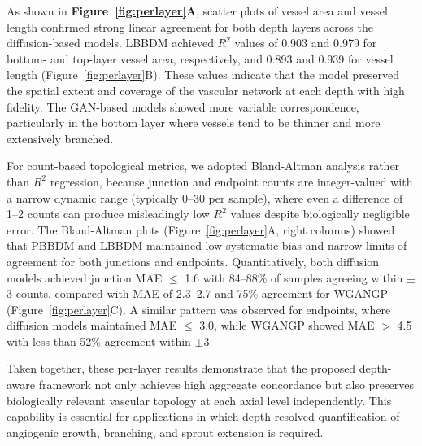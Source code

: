 As shown in \textbf{Figure~\ref{fig:perlayer}A}, scatter plots of vessel area and vessel length confirmed strong linear agreement for both depth layers across the diffusion-based models. LBBDM achieved $R^2$ values of 0.903 and 0.979 for bottom- and top-layer vessel area, respectively, and 0.893 and 0.939 for vessel length (Figure~\ref{fig:perlayer}B). These values indicate that the model preserved the spatial extent and coverage of the vascular network at each depth with high fidelity. The GAN-based models showed more variable correspondence, particularly in the bottom layer where vessels tend to be thinner and more extensively branched.

For count-based topological metrics, we adopted Bland-Altman analysis rather than $R^2$ regression, because junction and endpoint counts are integer-valued with a narrow dynamic range (typically 0--30 per sample), where even a difference of 1--2 counts can produce misleadingly low $R^2$ values despite biologically negligible error. The Bland-Altman plots (Figure~\ref{fig:perlayer}A, right columns) showed that PBBDM and LBBDM maintained low systematic bias and narrow limits of agreement for both junctions and endpoints. Quantitatively, both diffusion models achieved junction MAE $\leq$ 1.6 with 84--88\% of samples agreeing within $\pm$3 counts, compared with MAE of 2.3--2.7 and 75\% agreement for WGANGP (Figure~\ref{fig:perlayer}C). A similar pattern was observed for endpoints, where diffusion models maintained MAE $\leq$ 3.0, while WGANGP showed MAE $>$ 4.5 with less than 52\% agreement within $\pm$3.

Taken together, these per-layer results demonstrate that the proposed depth-aware framework not only achieves high aggregate concordance but also preserves biologically relevant vascular topology at each axial level independently. This capability is essential for applications in which depth-resolved quantification of angiogenic growth, branching, and sprout extension is required.



